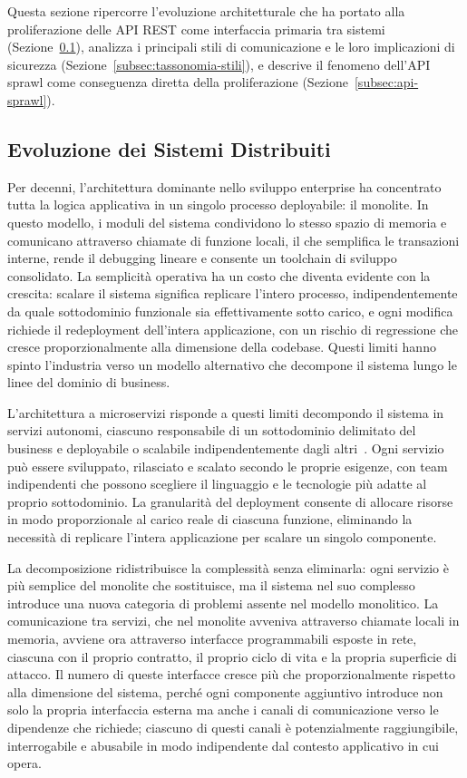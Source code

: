 Questa sezione ripercorre l'evoluzione architetturale che ha portato alla proliferazione delle \gls{API} REST come interfaccia primaria tra sistemi (Sezione~\ref{subsec:evoluzione-sistemi}), analizza i principali stili di comunicazione e le loro implicazioni di sicurezza (Sezione~\ref{subsec:tassonomia-stili}), e descrive il fenomeno dell'API sprawl come conseguenza diretta della proliferazione (Sezione~\ref{subsec:api-sprawl}).

\subsection{Evoluzione dei Sistemi Distribuiti}\label{subsec:evoluzione-sistemi}

Per decenni, l'architettura dominante nello sviluppo enterprise ha concentrato tutta la logica applicativa in un singolo processo deployabile: il monolite. In questo modello, i moduli del sistema condividono lo stesso spazio di memoria e comunicano attraverso chiamate di funzione locali, il che semplifica le transazioni interne, rende il debugging lineare e consente un toolchain di sviluppo consolidato. La semplicità operativa ha un costo che diventa evidente con la crescita: scalare il sistema significa replicare l'intero processo, indipendentemente da quale sottodominio funzionale sia effettivamente sotto carico, e ogni modifica richiede il redeployment dell'intera applicazione, con un rischio di regressione che cresce proporzionalmente alla dimensione della codebase. Questi limiti hanno spinto l'industria verso un modello alternativo che decompone il sistema lungo le linee del dominio di business.

L'architettura a microservizi risponde a questi limiti decompondo il sistema in servizi autonomi, ciascuno responsabile di un sottodominio delimitato del business e deployabile o scalabile indipendentemente dagli altri~\cite{dragoniMicroservicesYesterdayToday2017}.
Ogni servizio può essere sviluppato, rilasciato e scalato secondo le proprie esigenze, con team indipendenti che possono scegliere il linguaggio e le tecnologie più adatte al proprio sottodominio. La granularità del deployment consente di allocare risorse in modo proporzionale al carico reale di ciascuna funzione, eliminando la necessità di replicare l'intera applicazione per scalare un singolo componente.

La decomposizione ridistribuisce la complessità senza eliminarla: ogni servizio è più semplice del monolite che sostituisce, ma il sistema nel suo complesso introduce una nuova categoria di problemi assente nel modello monolitico. La comunicazione tra servizi, che nel monolite avveniva attraverso chiamate locali in memoria, avviene ora attraverso interfacce programmabili esposte in rete, ciascuna con il proprio contratto, il proprio ciclo di vita e la propria superficie di attacco. Il numero di queste interfacce cresce più che proporzionalmente rispetto alla dimensione del sistema, perché ogni componente aggiuntivo introduce non solo la propria interfaccia esterna ma anche i canali di comunicazione verso le dipendenze che richiede; ciascuno di questi canali è potenzialmente raggiungibile, interrogabile e abusabile in modo indipendente dal contesto applicativo in cui opera.


